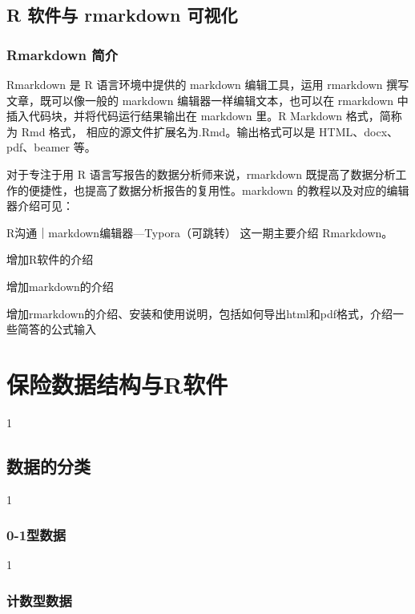 \documentclass[
]{book}
\begin{document}
\hypertarget{r-ux8f6fux4ef6ux4e0e-rmarkdown-ux53efux89c6ux5316}{%
\section{R 软件与 rmarkdown 可视化}\label{r-ux8f6fux4ef6ux4e0e-rmarkdown-ux53efux89c6ux5316}}

\hypertarget{rmarkdown-ux7b80ux4ecb}{%
\subsection{Rmarkdown 简介}\label{rmarkdown-ux7b80ux4ecb}}

Rmarkdown 是 R 语言环境中提供的 markdown 编辑工具，运用 rmarkdown 撰写文章，既可以像一般的 markdown 编辑器一样编辑文本，也可以在 rmarkdown 中插入代码块，并将代码运行结果输出在 markdown 里。R Markdown 格式，简称为 Rmd 格式， 相应的源文件扩展名为.Rmd。输出格式可以是 HTML、docx、pdf、beamer 等。

对于专注于用 R 语言写报告的数据分析师来说，rmarkdown 既提高了数据分析工作的便捷性，也提高了数据分析报告的复用性。markdown 的教程以及对应的编辑器介绍可见：

R沟通｜markdown编辑器---Typora（可跳转） 这一期主要介绍 Rmarkdown。

增加R软件的介绍

增加markdown的介绍

增加rmarkdown的介绍、安装和使用说明，包括如何导出html和pdf格式，介绍一些简答的公式输入

\hypertarget{chp1}{%
\chapter{保险数据结构与R软件}\label{chp1}}

1

\hypertarget{ux6570ux636eux7684ux5206ux7c7b}{%
\section{数据的分类}\label{ux6570ux636eux7684ux5206ux7c7b}}

1

\hypertarget{ux578bux6570ux636e}{%
\subsection{0-1型数据}\label{ux578bux6570ux636e}}

1

\hypertarget{ux8ba1ux6570ux578bux6570ux636e}{%
\subsection{计数型数据}\label{ux8ba1ux6570ux578bux6570ux636e}}
\end{document}

